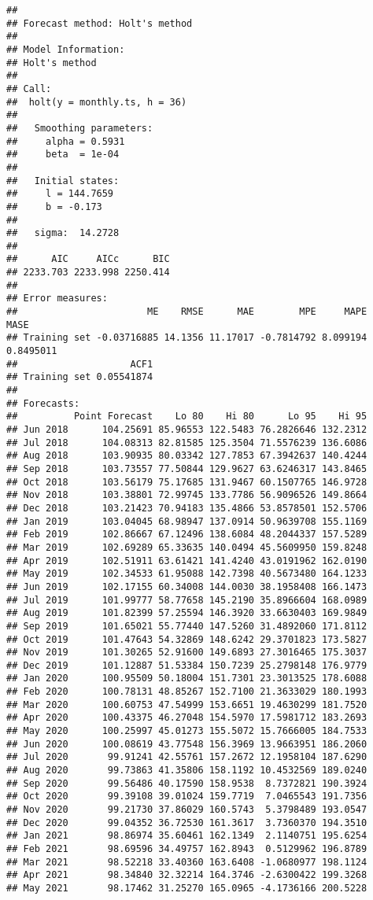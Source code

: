\documentclass[
]{article}
\begin{document}
\begin{verbatim}
## 
## Forecast method: Holt's method
## 
## Model Information:
## Holt's method 
## 
## Call:
##  holt(y = monthly.ts, h = 36) 
## 
##   Smoothing parameters:
##     alpha = 0.5931 
##     beta  = 1e-04 
## 
##   Initial states:
##     l = 144.7659 
##     b = -0.173 
## 
##   sigma:  14.2728
## 
##      AIC     AICc      BIC 
## 2233.703 2233.998 2250.414 
## 
## Error measures:
##                       ME    RMSE      MAE        MPE     MAPE      MASE
## Training set -0.03716885 14.1356 11.17017 -0.7814792 8.099194 0.8495011
##                    ACF1
## Training set 0.05541874
## 
## Forecasts:
##          Point Forecast    Lo 80    Hi 80      Lo 95    Hi 95
## Jun 2018      104.25691 85.96553 122.5483 76.2826646 132.2312
## Jul 2018      104.08313 82.81585 125.3504 71.5576239 136.6086
## Aug 2018      103.90935 80.03342 127.7853 67.3942637 140.4244
## Sep 2018      103.73557 77.50844 129.9627 63.6246317 143.8465
## Oct 2018      103.56179 75.17685 131.9467 60.1507765 146.9728
## Nov 2018      103.38801 72.99745 133.7786 56.9096526 149.8664
## Dec 2018      103.21423 70.94183 135.4866 53.8578501 152.5706
## Jan 2019      103.04045 68.98947 137.0914 50.9639708 155.1169
## Feb 2019      102.86667 67.12496 138.6084 48.2044337 157.5289
## Mar 2019      102.69289 65.33635 140.0494 45.5609950 159.8248
## Apr 2019      102.51911 63.61421 141.4240 43.0191962 162.0190
## May 2019      102.34533 61.95088 142.7398 40.5673480 164.1233
## Jun 2019      102.17155 60.34008 144.0030 38.1958408 166.1473
## Jul 2019      101.99777 58.77658 145.2190 35.8966604 168.0989
## Aug 2019      101.82399 57.25594 146.3920 33.6630403 169.9849
## Sep 2019      101.65021 55.77440 147.5260 31.4892060 171.8112
## Oct 2019      101.47643 54.32869 148.6242 29.3701823 173.5827
## Nov 2019      101.30265 52.91600 149.6893 27.3016465 175.3037
## Dec 2019      101.12887 51.53384 150.7239 25.2798148 176.9779
## Jan 2020      100.95509 50.18004 151.7301 23.3013525 178.6088
## Feb 2020      100.78131 48.85267 152.7100 21.3633029 180.1993
## Mar 2020      100.60753 47.54999 153.6651 19.4630299 181.7520
## Apr 2020      100.43375 46.27048 154.5970 17.5981712 183.2693
## May 2020      100.25997 45.01273 155.5072 15.7666005 184.7533
## Jun 2020      100.08619 43.77548 156.3969 13.9663951 186.2060
## Jul 2020       99.91241 42.55761 157.2672 12.1958104 187.6290
## Aug 2020       99.73863 41.35806 158.1192 10.4532569 189.0240
## Sep 2020       99.56486 40.17590 158.9538  8.7372821 190.3924
## Oct 2020       99.39108 39.01024 159.7719  7.0465543 191.7356
## Nov 2020       99.21730 37.86029 160.5743  5.3798489 193.0547
## Dec 2020       99.04352 36.72530 161.3617  3.7360370 194.3510
## Jan 2021       98.86974 35.60461 162.1349  2.1140751 195.6254
## Feb 2021       98.69596 34.49757 162.8943  0.5129962 196.8789
## Mar 2021       98.52218 33.40360 163.6408 -1.0680977 198.1124
## Apr 2021       98.34840 32.32214 164.3746 -2.6300422 199.3268
## May 2021       98.17462 31.25270 165.0965 -4.1736166 200.5228
\end{verbatim}
\end{document}
